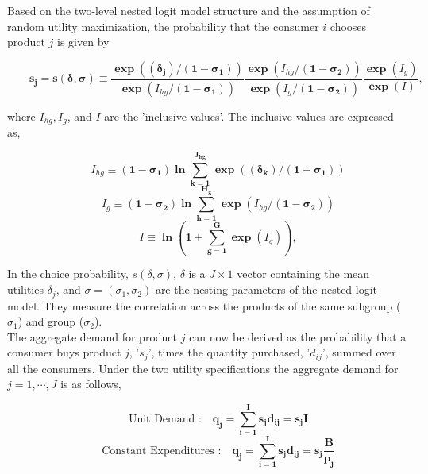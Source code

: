 \documentclass[a4paper,11pt]{article}
\begin{document}
    Based on the two-level nested logit model structure and the assumption of random utility maximization, the probability that the consumer $i$ chooses product $j$ is given by

    \begin{equation*}
        \qquad \mathbf{s_{j} = s(\delta,\sigma) \equiv \dfrac{\exp((\delta_{j})/(1 - \sigma_{1}))}{\exp(\mathit{I_{hg}}/(1 - \sigma_{1}))} \dfrac{\exp(\mathit{I_{hg}}/(1 - \sigma_{2}))}{\exp(\mathit{I_{g}}/(1 - \sigma_{2}))} \dfrac{\exp(\mathit{I_{g}})}{\exp(\mathit{I})}},
    \end{equation*}

    where $\mathit{I_{hg},I_{g}}$, and $\mathit{I}$ are the 'inclusive values'. The inclusive values are expressed as,

    \begin{equation*}
        \qquad \mathbf{\mathit{I_{hg}} \equiv (1 - \sigma_{1}) \ln \sum_{k = 1}^{J_{hg}} \exp((\delta_{k})/(1 - \sigma_{1}))}
    \end{equation*}
    \begin{equation*}
        \qquad \mathbf{\mathit{I_{g}} \equiv (1 - \sigma_{2}) \ln \sum_{h = 1}^{H_{g}} \exp(\mathit{I_{hg}}/(1 - \sigma_{2}))}
    \end{equation*}
    \begin{equation*}
        \qquad \mathbf{\mathit{I} \equiv \ln \left(1 + \sum_{g = 1}^{G} \exp(\mathit{I_{g}}) \right) },
    \end{equation*}

    In the choice probability, $s(\delta,\sigma)$, $\delta$ is a $J \times 1$ vector containing the mean utilities $\delta_{j}$, and $\sigma = (\sigma_{1},\sigma_{2})$ are the nesting parameters of the nested logit model. They measure the correlation across the products of the same subgroup ($\sigma_{1}$) and group ($\sigma_{2}$).\\

    \newpage
    The aggregate demand for product $j$ can now be derived as the probability that a consumer buys product $j$, '$s_{j}$', times the quantity purchased, '$d_{ij}$', summed over all the consumers. Under the two utility specifications the aggregate demand for $j = 1, \cdots, J$ is as follows,

    \begin{equation*}
        \qquad \text{Unit Demand :} \quad \mathbf{q_{j} = \sum_{i = 1}^{I} s_{j}d_{ij} = s_{j}I}
    \end{equation*}
    \begin{equation*}
        \qquad \text{Constant Expenditures :} \quad \mathbf{q_{j} = \sum_{i = 1}^{I} s_{j}d_{ij} = s_{j}\dfrac{B}{p_{j}}}
    \end{equation*}
\end{document}
